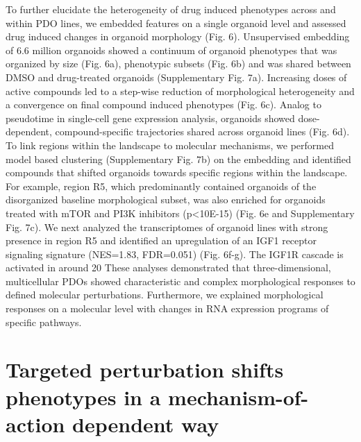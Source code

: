 To further elucidate the heterogeneity of drug induced phenotypes across and within PDO lines, we embedded features on a single organoid level and assessed drug induced changes in organoid morphology (Fig. 6). Unsupervised embedding of 6.6 million organoids showed a continuum of organoid phenotypes that was organized by size (Fig. 6a), phenotypic subsets (Fig. 6b) and was shared between DMSO and drug-treated organoids (Supplementary Fig. 7a). Increasing doses of active compounds led to a step-wise reduction of morphological heterogeneity and a convergence on final compound induced phenotypes (Fig. 6c). Analog to pseudotime in single-cell gene expression analysis, organoids showed dose-dependent, compound-specific trajectories shared across organoid lines (Fig. 6d). To link regions within the landscape to molecular mechanisms, we performed model based clustering (Supplementary Fig. 7b) on the embedding and identified compounds that shifted organoids towards specific regions within the landscape. For example, region R5, which predominantly contained organoids of the disorganized baseline morphological subset, was also enriched for organoids treated with mTOR and PI3K inhibitors (p<10E-15) (Fig. 6e and Supplementary Fig. 7c). We next analyzed the transcriptomes of organoid lines with strong presence in region R5 and identified an upregulation of an IGF1 receptor signaling signature (NES=1.83, FDR=0.051) (Fig. 6f-g). The IGF1R cascade is activated in around 20%
These analyses demonstrated that three-dimensional, multicellular PDOs showed characteristic and complex morphological responses to defined molecular perturbations. Furthermore, we explained morphological responses on a molecular level with changes in RNA expression programs of specific pathways. 

\section{Targeted perturbation shifts phenotypes in a mechanism-of-action dependent way}


